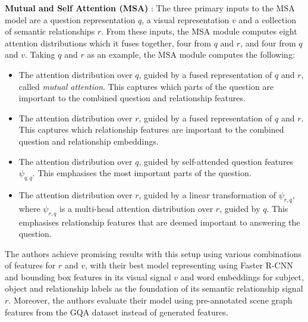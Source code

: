 \textbf{Mutual and Self Attention (MSA)} \cite{farazi2020attention}: The three primary inputs to the MSA model are a question representation \(q\), a visual representation \(v\) and a collection of semantic relationships \(r\). From these inputs, the MSA module computes eight attention distributions which it fuses together, four from \(q\) and \(r\), and four from \(q\) and \(v\). Taking \(q\) and \(r\) as an example, the MSA module computes the following:

\begin{itemize}
    \item The attention distribution over \(q\), guided by a fused representation of \(q\) and \(r\), called \textit{mutual attention}. This captures which parts of the question are important to the combined question and relationship features.
    \item The attention distribution over \(r\), guided by a fused representation of \(q\) and \(r\). This captures which relationship features are important to the combined question and relationship embeddings.
    \item The attention distribution over \(q\), guided by self-attended question features \(\psi_{q, q}\). This emphasises the most important parts of the question.
    \item The attention distribution over \(r\), guided by a linear transformation of \(\psi_{r, q}\), where \(\psi_{r, q}\) is a multi-head attention distribution over \(r\), guided by \(q\). This emphasises relationship features that are deemed important to answering the question.
\end{itemize}

The authors achieve promising results with this setup using various combinations of features for \(r\) and \(v\), with their best model representing using Faster R-CNN and bounding box features in its visual signal \(v\) and word embeddings for subject,
object and relationship labels as the foundation of its semantic relationship signal \(r\). Moreover, the authors evaluate their model using pre-annotated scene graph features from the GQA dataset instead of generated features.

